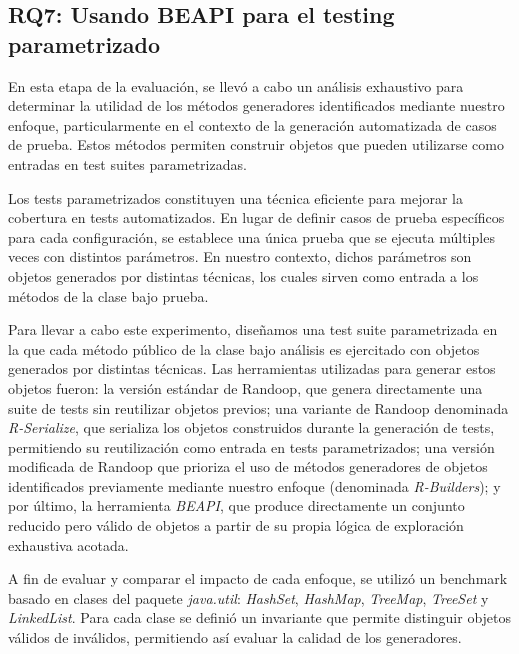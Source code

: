 

\subsection{RQ7: Usando BEAPI para el testing parametrizado}

En esta etapa de la evaluación, se llevó a cabo un análisis exhaustivo para determinar la 
utilidad de los métodos generadores identificados mediante nuestro enfoque, particularmente 
en el contexto de la generación automatizada de casos de prueba. Estos métodos permiten construir 
objetos que pueden utilizarse como entradas en test suites parametrizadas.

Los tests parametrizados constituyen una técnica eficiente para mejorar la cobertura en tests 
automatizados. En lugar de definir casos de prueba específicos para cada configuración, se 
establece una única prueba que se ejecuta múltiples veces con distintos parámetros. En nuestro 
contexto, dichos parámetros son objetos generados por distintas técnicas, los cuales sirven como 
entrada a los métodos de la clase bajo prueba.

Para llevar a cabo este experimento, diseñamos una test suite parametrizada en la que cada método 
público de la clase bajo análisis es ejercitado con objetos generados por distintas técnicas. Las 
herramientas utilizadas para generar estos objetos fueron: la versión estándar de Randoop, que 
genera directamente una suite de tests sin reutilizar objetos previos; una variante de Randoop 
denominada \emph{R-Serialize}, que serializa los objetos construidos durante la generación de 
tests, permitiendo su reutilización como entrada en tests parametrizados; una versión modificada 
de Randoop que prioriza el uso de métodos generadores de objetos identificados previamente mediante 
nuestro enfoque (denominada \emph{R-Builders}); y por último, la herramienta \emph{BEAPI}, que 
produce directamente un conjunto reducido pero válido de objetos a partir de su propia lógica de 
exploración exhaustiva acotada.

A fin de evaluar y comparar el impacto de cada enfoque, se utilizó un benchmark basado en clases 
del paquete \emph{java.util}: \emph{HashSet}, \emph{HashMap}, \emph{TreeMap}, \emph{TreeSet} y \emph{LinkedList}.
Para cada clase se definió un invariante que permite distinguir objetos válidos de inválidos, permitiendo así evaluar la calidad de los generadores.

